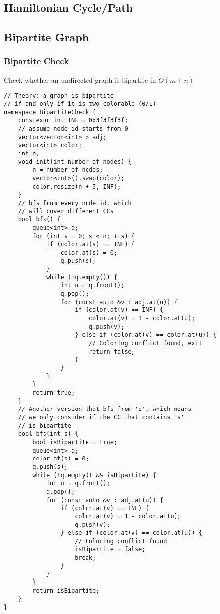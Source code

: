 \documentclass[10pt]{article}{\twocolumn}
\begin{document}
\subsection{Hamiltonian Cycle/Path}

\subsection{Bipartite Graph}
\subsubsection{Bipartite Check}
Check whether an undirected graph is bipartite in $O(m+n)$
\begin{lstlisting}
// Theory: a graph is bipartite 
// if and only if it is two-colorable (0/1)
namespace BipartiteCheck {
    constexpr int INF = 0x3f3f3f3f;
    // assume node id starts from 0
    vector<vector<int> > adj;
    vector<int> color;
    int n;
    void init(int number_of_nodes) {
        n = number_of_nodes;
        vector<int>().swap(color);
        color.resize(n + 5, INF);
    }
    // bfs from every node id, which 
    // will cover different CCs
    bool bfs() {
        queue<int> q;
        for (int s = 0; s < n; ++s) {
            if (color.at(s) == INF) {
                color.at(s) = 0;
                q.push(s);
            }
            while (!q.empty()) {
                int u = q.front();
                q.pop();
                for (const auto &v : adj.at(u)) {
                    if (color.at(v) == INF) {
                        color.at(v) = 1 - color.at(u);
                        q.push(v);
                    } else if (color.at(v) == color.at(u)) {
                        // Coloring conflict found, exit
                        return false;
                    }
                }
            }
        }
        return true;
    }
    // Another version that bfs from 's', which means
    // we only consider if the CC that contains 's' 
    // is bipartite
    bool bfs(int s) {
        bool isBipartite = true;
        queue<int> q;
        color.at(s) = 0;
        q.push(s);
        while (!q.empty() && isBipartite) {
            int u = q.front();
            q.pop();
            for (const auto &v : adj.at(u)) {
                if (color.at(v) == INF) {
                    color.at(v) = 1 - color.at(u);
                    q.push(v);
                } else if (color.at(v) == color.at(u)) {
                    // Coloring conflict found
                    isBipartite = false;
                    break;
                }
            }
        }
        return isBipartite;
    }
}
\end{lstlisting}
\end{document}
